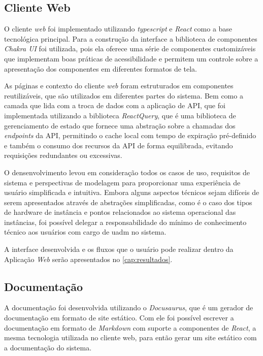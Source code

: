 \subsection{Cliente Web}
\label{subsec:clienteWeb}

O cliente \textit{web} foi implementado utilizando \textit{typescript} e \textit{React} como a base tecnológica principal. Para a construção da interface a biblioteca de componentes \textit{Chakra UI} foi utilizada, pois ela oferece uma série de componentes customizáveis que implementam boas práticas de acessibilidade e permitem um controle sobre a apresentação dos componentes em diferentes formatos de tela.

As páginas e contexto do cliente \textit{web} foram estruturados em componentes reutilizáveis, que são utilizados em diferentes partes do sistema. Bem como a camada que lida com a troca de dados com a aplicação de API, que foi implementada utilizando a biblioteca \textit{ReactQuery}, que é uma biblioteca de gerenciamento de estado que fornece uma abstração sobre a chamadas dos \textit{endpoints} da API, permitindo o cache local com tempo de expiração pré-definido e também o consumo dos recursos da API de forma equilibrada, evitando requisições redundantes ou excessivas.

O densenvolvimento levou em consideração todos os casos de uso, requisitos de sistema e perspectivas de modelagem para proporcionar uma experiência de usuário simplificada e intuitiva. Embora alguns aspectos técnicos sejam difíceis de serem apresentados através de abstrações simplificadas, como é o caso dos tipos de hardware de instância e pontos relacionados ao sistema operacional das instâncias, foi possível delegar a responsabilidade do mínimo de conhecimento técnico aos usuários com cargo de \gls{uadm} no sistema.

A interface desenvolvida e os fluxos que o usuário pode realizar dentro da Aplicação \textit{Web} serão apresentados no \autoref{cap:resultados}.

\subsection{Documentação}
\label{subsec:documentacao}

A documentação foi desenvolvida utilizando o \textit{Docusaurus}, que é um gerador de documentação em formato de site estático. Com ele foi possível escrever a documentação em formato de \textit{Markdown} com suporte a componentes de \textit{React}, a mesma tecnologia utilizada no cliente web, para então gerar um site estático com a documentação do sistema.

